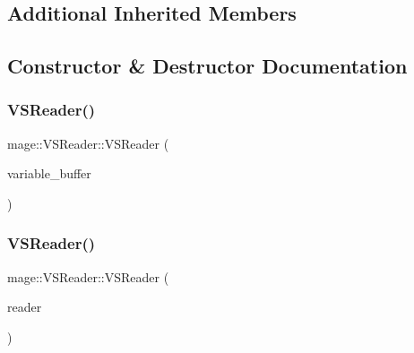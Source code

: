 \subsection*{Additional Inherited Members}


\subsection{Constructor \& Destructor Documentation}
\hypertarget{classmage_1_1_v_s_reader_a65aef6605c6104a0305937f231ef2106}{}\label{classmage_1_1_v_s_reader_a65aef6605c6104a0305937f231ef2106} 
\subsubsection{\texorpdfstring{V\+S\+Reader()}{VSReader()}\hspace{0.1cm}{\footnotesize\ttfamily [1/3]}}
{\footnotesize\ttfamily mage\+::\+V\+S\+Reader\+::\+V\+S\+Reader (\begin{DoxyParamCaption}\item[{vector$<$ \hyperlink{structmage_1_1_variable}{Variable} $\ast$ $>$ \&}]{variable\+\_\+buffer }\end{DoxyParamCaption})\hspace{0.3cm}{\ttfamily [explicit]}}

\hypertarget{classmage_1_1_v_s_reader_aec7ec2ea03d5d77c5e78438a60263a73}{}\label{classmage_1_1_v_s_reader_aec7ec2ea03d5d77c5e78438a60263a73} 
\subsubsection{\texorpdfstring{V\+S\+Reader()}{VSReader()}\hspace{0.1cm}{\footnotesize\ttfamily [2/3]}}
{\footnotesize\ttfamily mage\+::\+V\+S\+Reader\+::\+V\+S\+Reader (\begin{DoxyParamCaption}\item[{const \hyperlink{classmage_1_1_v_s_reader}{V\+S\+Reader} \&}]{reader }\end{DoxyParamCaption})\hspace{0.3cm}{\ttfamily [delete]}}

\hypertarget{classmage_1_1_v_s_reader_a84ba10ef4d308d94ea947155ab72d82a}{}\label{classmage_1_1_v_s_reader_a84ba10ef4d308d94ea947155ab72d82a} 
